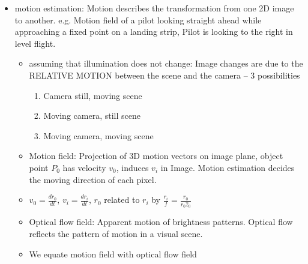 \documentclass[10pt]{article}
\begin{document}
\begin{itemize}[label=\(\star\), leftmargin=1em, itemsep=-0.3em]
    \item motion estimation: Motion describes the transformation from one 2D image to another. e.g. Motion field of a pilot looking straight ahead while approaching a fixed point on a landing strip, Pilot is looking to the right in level flight.
          \begin{itemize}[label=\(\star\), leftmargin=1em, itemsep=-0.3em]
              \item assuming that illumination does not change:  Image changes are due to the RELATIVE MOTION between the scene and the camera -- 3 possibilities
                    \begin{enumerate}[label=\(\star\), leftmargin=1em, itemsep=-0.3em]
                        \item Camera still, moving scene
                        \item  Moving camera, still scene
                        \item Moving camera, moving scene
                    \end{enumerate}
              \item Motion field: Projection of 3D motion vectors on image plane, object point $P_0$ has velocity $v_0$, induces $v_i$ in Image. Motion estimation decides the moving direction of each pixel.
              \item[] $v_0 =\frac{dr_0}{dt}$, $v_i = \frac{dr_i}{dt}$, $r_0$ related to $r_i$ by $\frac{r_i}{f} = \frac{r_0}{r_0 \hat{z}_0}$

              \item Optical flow field: Apparent motion of brightness patterns. Optical flow reflects the pattern of motion in a visual scene.
              \item We equate motion field with optical flow field
          \end{itemize}


\end{itemize}
\end{document}
